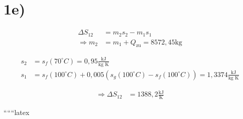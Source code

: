 

\section*{1e)}

\begin{align*}
\Delta S_{12} &= m_2 s_2 - m_1 s_1 \\
\Rightarrow m_2 &= m_1 + Q_{\text{zu}} = 8572,45 \text{kg}
\end{align*}

\begin{align*}
s_2 &= s_f(70^\circ C) = 0,95 \frac{\text{kJ}}{\text{kg K}} \\
s_1 &= s_f(100^\circ C) + 0,005 (s_g(100^\circ C) - s_f(100^\circ C)) = 1,3374 \frac{\text{kJ}}{\text{kg K}}
\end{align*}

\begin{align*}
\Rightarrow \Delta S_{12} &= 1388,2 \frac{\text{kJ}}{\text{K}}
\end{align*}

``````latex